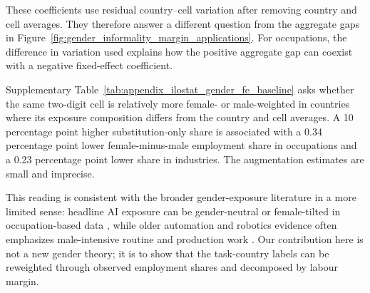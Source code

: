 \documentclass[11pt]{article}
\begin{document}
These coefficients use residual country--cell variation after removing country and cell averages. They therefore answer a different question from the aggregate gaps in Figure~\ref{fig:gender_informality_margin_applications}. For occupations, the difference in variation used explains how the positive aggregate gap can coexist with a negative fixed-effect coefficient.

Supplementary Table~\ref{tab:appendix_ilostat_gender_fe_baseline} asks whether the same two-digit cell is relatively more female- or male-weighted in countries where its exposure composition differs from the country and cell averages. A 10 percentage point higher substitution-only share is associated with a 0.34 percentage point lower female-minus-male employment share in occupations and a 0.23 percentage point lower share in industries. The augmentation estimates are small and imprecise.

This reading is consistent with the broader gender-exposure literature in a more limited sense: headline AI exposure can be gender-neutral or female-tilted in occupation-based data \citep{PizzinelliEtAl2023,CazzanigaPantonLiPizzinelliTavares2025GenderLens,GmyrekBergBescond2023,GmyrekEtAl2025}, while older automation and robotics evidence often emphasizes male-intensive routine and production work \citep{AcemogluRestrepo2018,brussevich2019_gender,imf2019_genderautomation}. Our contribution here is not a new gender theory; it is to show that the task-country labels can be reweighted through observed employment shares and decomposed by labour margin.
\end{document}
